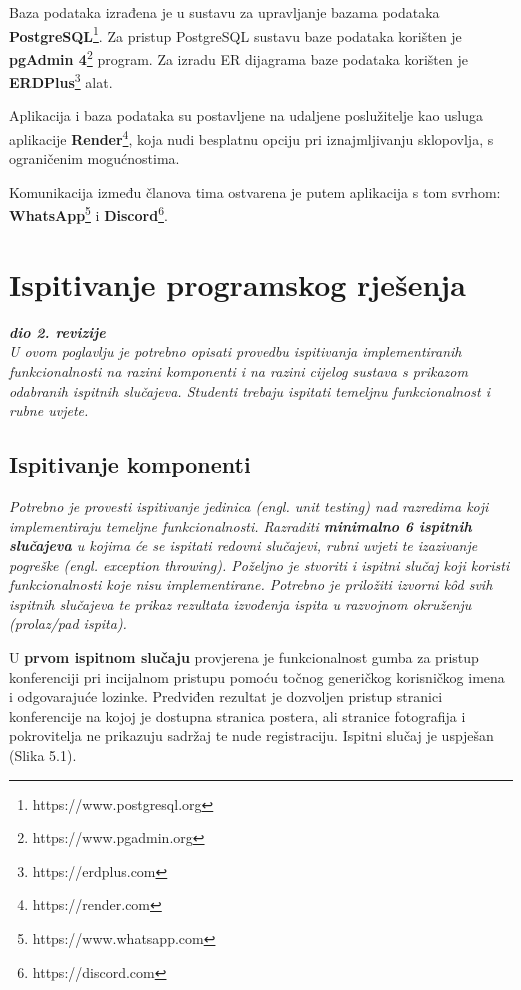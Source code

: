 			Baza podataka izrađena je u sustavu za upravljanje bazama podataka \textbf{PostgreSQL}\footnote{https://www.postgresql.org}. Za pristup PostgreSQL sustavu baze podataka korišten je \textbf{pgAdmin 4}\footnote{https://www.pgadmin.org} program. Za izradu ER dijagrama baze podataka korišten je \textbf{ERDPlus}\footnote{https://erdplus.com} alat.
			
			Aplikacija i baza podataka su postavljene na udaljene poslužitelje kao usluga aplikacije \textbf{Render}\footnote{https://render.com}, koja nudi besplatnu opciju pri iznajmljivanju sklopovlja, s ograničenim mogućnostima.
			
			Komunikacija između članova tima ostvarena je putem aplikacija s tom svrhom: \textbf{WhatsApp}\footnote{https://www.whatsapp.com} i \textbf{Discord}\footnote{https://discord.com}.
			
			\eject 
		
	
		\section{Ispitivanje programskog rješenja}
			
			\textbf{\textit{dio 2. revizije}}\\
			
			 \textit{U ovom poglavlju je potrebno opisati provedbu ispitivanja implementiranih funkcionalnosti na razini komponenti i na razini cijelog sustava s prikazom odabranih ispitnih slučajeva. Studenti trebaju ispitati temeljnu funkcionalnost i rubne uvjete.}
			
			\subsection{Ispitivanje komponenti}
			\textit{Potrebno je provesti ispitivanje jedinica (engl. unit testing) nad razredima koji implementiraju temeljne funkcionalnosti. Razraditi \textbf{minimalno 6 ispitnih slučajeva} u kojima će se ispitati redovni slučajevi, rubni uvjeti te izazivanje pogreške (engl. exception throwing). Poželjno je stvoriti i ispitni slučaj koji koristi funkcionalnosti koje nisu implementirane. Potrebno je priložiti izvorni kôd svih ispitnih slučajeva te prikaz rezultata izvođenja ispita u razvojnom okruženju (prolaz/pad ispita). }
			
			U \textbf{prvom ispitnom slučaju} provjerena je funkcionalnost gumba za pristup konferenciji pri incijalnom pristupu pomoću točnog generičkog korisničkog imena i odgovarajuće lozinke. Predviđen rezultat je dozvoljen pristup stranici konferencije na kojoj je dostupna stranica postera, ali stranice fotografija i pokrovitelja ne prikazuju sadržaj te nude registraciju. Ispitni slučaj je uspješan (Slika 5.1).
			
